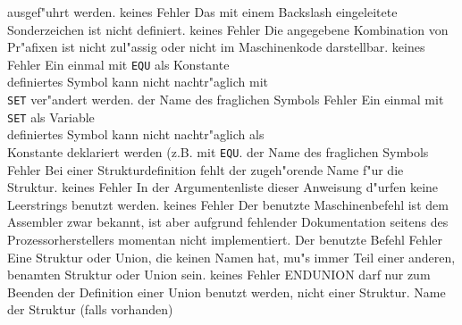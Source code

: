 \documentclass[12pt,a4paper,twoside]{report}
\begin{document}
\begin{description}
{                ausgef"uhrt werden.}
               {keines}
               {Fehler}
               {Das mit einem Backslash eingeleitete
	        Sonderzeichen ist nicht definiert.}
               {keines}
               {Fehler}
               {Die angegebene Kombination von Pr"afixen
	        ist nicht zul"assig oder nicht im
	        Maschinenkode darstellbar.}
               {keines}
               {Fehler}
               {Ein einmal mit {\tt EQU} als Konstante\\
                definiertes Symbol kann nicht nachtr"aglich mit\\
                {\tt SET} ver"andert werden.}
               {der Name des fraglichen Symbols}
               {Fehler}
               {Ein einmal mit {\tt SET} als Variable\\
                definiertes Symbol kann nicht nachtr"aglich als\\
                Konstante deklariert werden (z.B. mit {\tt EQU}.}
               {der Name des fraglichen Symbols}
               {Fehler}
               {Bei einer Strukturdefinition fehlt der zugeh"orende
                Name f"ur die Struktur.}
               {keines}
               {Fehler}
               {In der Argumentenliste dieser Anweisung d"urfen keine
                Leerstrings benutzt werden.}
               {keines}
               {Fehler}
               {Der benutzte Maschinenbefehl ist dem Assembler
                zwar bekannt, ist aber aufgrund fehlender
                Dokumentation seitens des Prozessorherstellers
                momentan nicht implementiert.}
               {Der benutzte Befehl}
               {Fehler}
               {Eine Struktur oder Union, die keinen Namen hat, mu"s
                immer Teil einer anderen, benamten Struktur oder Union
                sein.}
               {keines}
               {Fehler}
               {ENDUNION darf nur zum Beenden der Definition einer
                Union benutzt werden, nicht einer Struktur.}
               {Name der Struktur (falls vorhanden)}

\end{description}
\end{document}
